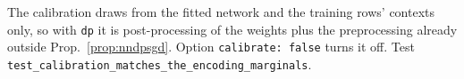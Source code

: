 \noindent The calibration draws from the fitted network and the training rows' contexts only, so with \texttt{dp} it is post-processing of the weights plus the preprocessing already outside Prop.~\ref{prop:nndpsgd}. Option \texttt{calibrate: false} turns it off. Test \texttt{test\_calibration\_matches\_the\_encoding\_marginals}.

\setcounter{proposition}{\value{savedpropneural}}
